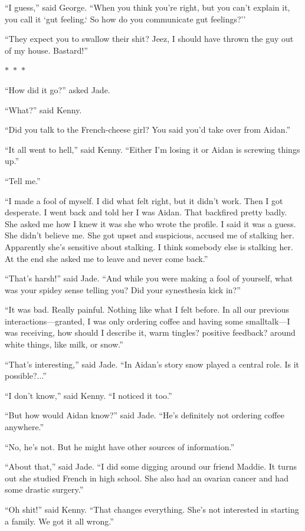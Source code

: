 \documentclass{memoir}
\newcommand{\starbreak}{%
\begin{center}
  $\ast$~$\ast$~$\ast$
\end{center}
}
\begin{document}
``I guess,'' said George. ``When you think you're right, but you can't explain it, you call it `gut feeling.` So how do you communicate gut feelings?''

``They expect you to swallow their shit? Jeez, I should have thrown the guy out of my house. Bastard!''


\starbreak

``How did it go?'' asked Jade.

``What?'' said Kenny.

``Did you talk to the French-cheese girl? You said you'd take over from Aidan.''

``It all went to hell,'' said Kenny. ``Either I'm losing it or Aidan is screwing things up.''

``Tell me.''

``I made a fool of myself. I did what felt right, but it didn't work. Then I got desperate. I went back and told her I was Aidan. That backfired pretty badly. She asked me how I knew it was she who wrote the profile. I said it was a guess. She didn't believe me. She got upset and suspicious, accused me of stalking her. Apparently she's sensitive about stalking. I think somebody else is stalking her. At the end she asked me to leave and never come back.''

``That's harsh!'' said Jade. ``And while you were making a fool of yourself, what was your spidey sense telling you? Did your synesthesia kick in?''

``It was bad. Really painful. Nothing like what I felt before. In all our previous interactions---granted, I was only ordering coffee and having some smalltalk---I was receiving, how should I describe it, warm tingles? positive feedback? around white things, like milk, or snow.''

``That's interesting,'' said Jade. ``In Aidan's story snow played a central role. Is it possible?...''

``I don't know,'' said Kenny. ``I noticed it too.''

``But how would Aidan know?'' said Jade. ``He's definitely not ordering coffee anywhere.''

``No, he's not. But he might have other sources of information.''

``About that,'' said Jade. ``I did some digging around our friend Maddie. It turns out she studied French in high school. She also had an ovarian cancer and had some drastic surgery.''

``Oh shit!'' said Kenny. ``That changes everything. She's not interested in starting a family. We got it all wrong.''
\end{document}
